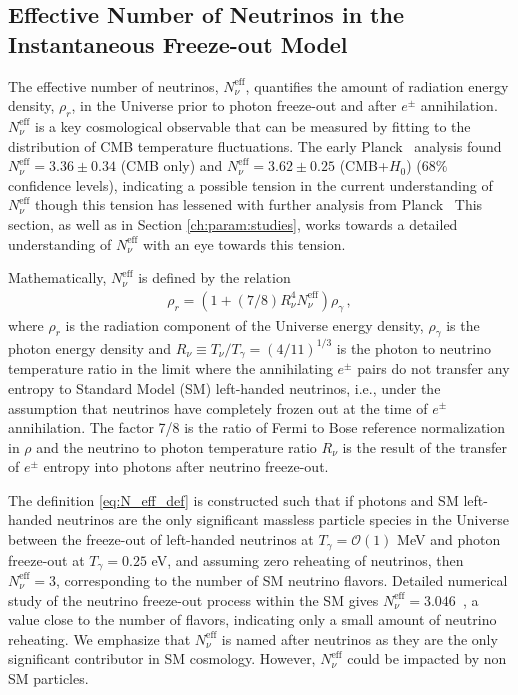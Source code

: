 \subsection{Effective Number of Neutrinos  in the Instantaneous  Freeze-out Model}\label{sec:model:ind}

The effective number of neutrinos, $N^{\text{eff}}_\nu$, quantifies the amount of radiation energy density, $\rho_r$, in the Universe prior to photon freeze-out and after $e^\pm$ annihilation.  $N^{\text{eff}}_\nu$ is a key cosmological observable that can be  measured by fitting to the distribution of CMB temperature fluctuations. The early  Planck~\cite{Planck:2013pxb} analysis found $N^{\text{eff}}_{\nu}=3.36\pm 0.34$ (CMB only) and $N^{\text{eff}}_{\nu}=3.62\pm 0.25$ (CMB+$H_0$) ($68\%$ confidence levels), indicating a possible tension in the current understanding of $N^{\text{eff}}_\nu$ though this tension has lessened with further analysis from Planck~\cite{Planck:2015fie,Planck:2018vyg} This section, as well as in Section \ref{ch:param:studies}, works towards a detailed understanding of $N^{\text{eff}}_{\nu}$ with an eye towards this tension.

Mathematically, $N^{\text{eff}}_\nu$ is defined by the relation
\begin{align}\label{eq:N_eff_def}
\rho_r=\left(1+(7/8)R_\nu^{4}N^{\text{eff}}_\nu\right)\rho_\gamma\,,
\end{align}
where $\rho_r$ is the radiation component of the Universe  energy density, $\rho_\gamma$ is the photon energy density and  $R_\nu\equiv T_\nu/T_\gamma=({4}/{11})^{1/3}$ is the photon to neutrino temperature ratio in the limit where  the annihilating $e^\pm$ pairs do not transfer any entropy  to  Standard Model (SM) left-handed neutrinos, i.e., under the assumption that neutrinos have completely frozen out at the time of $e^\pm$ annihilation.  The factor 7/8 is the ratio of Fermi to Bose reference normalization in $\rho$ and the neutrino to photon temperature ratio $R_\nu$ is the result of the transfer of $e^\pm$ entropy into photons after  neutrino freeze-out.  

The definition \ref{eq:N_eff_def} is constructed such that if photons and SM left-handed neutrinos are the only significant massless particle species in the Universe between the freeze-out of left-handed neutrinos at  $T_\gamma=\mathcal{O}(1)$ MeV and photon freeze-out at $T_\gamma=0.25$ eV, and assuming zero reheating of neutrinos, then $N^{\text{eff}}_{\nu}=3$, corresponding to the number of SM neutrino flavors.  Detailed numerical study of the neutrino freeze-out process within the SM gives $N^{\text{eff}}_{\nu}=3.046$~\cite{Mangano:2005cc}, a value close to the number of flavors, indicating only a small amount of neutrino reheating.  
 We emphasize that $N^{\text{eff}}_\nu$ is named after neutrinos as they are the only significant contributor in SM cosmology. However,   $N^{\text{eff}}_\nu$ could be impacted by non SM particles.

